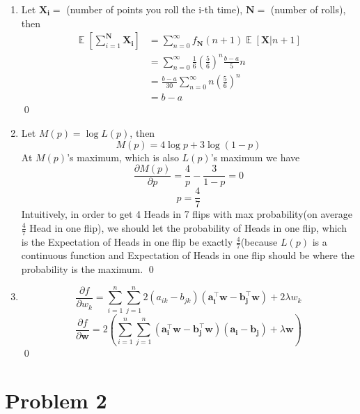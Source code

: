 \documentclass[12pt]{article}
\begin{document}
\begin{enumerate}[label=(\alph*)]
  \item
    Let $\mathbf{X_i} =$ (number of points you roll the i-th time), $\mathbf{N} =$ (number of rolls), then
    \begin{align*} \mathop{\mathbb{E}}[\sum_{i=1}^{\mathbf{N}}{\mathbf{X_i}}] &= \sum_{n=0}^{\infty}f_{\mathbf{N}}(n+1)\mathop{\mathbb{E}}[\mathbf{X}|n+1] \\
    &= \sum_{n=0}^{\infty}\frac{1}{6}(\frac{5}{6})^n\frac{b-a}{5}n \\
    &= \frac{b-a}{30}\sum_{n=0}^{\infty}n(\frac{5}{6})^n \\
    &= b-a\end{align*}  \qed

  \item
    Let $M(p) = \log{L(p)}$, then
    \begin{equation}M(p) = 4\log{p}+3\log{(1-p)}\end{equation}
    At $M(p)$'s maximum, which is also $L(p)$'s maximum we have
    \begin{equation}\frac{\partial{M(p)}}{\partial p}=\frac{4}{p}-\frac{3}{1-p}=0\end{equation}
    \begin{equation}p = \frac{4}{7}\end{equation}
    Intuitively, in order to get 4 Heads in 7 flips with max probability(on average $\frac{4}{7}$ Head in one flip), we should let the probability of Heads in one flip, which is the Expectation of Heads in one flip be exactly $\frac{4}{7}$(because $L(p)$ is a continuous function and Expectation of Heads in one flip should be where the probability is the maximum. \qed
    
  \item 
    \begin{equation}\frac{\partial f}{\partial w_k} = \sum_{i=1}^{n}\sum_{j=1}^{n}2(a_{ik}-b_{jk})(\mathbf{a_i^\top w-b_j^\top w})+2\lambda w_k\end{equation}
    \begin{equation}\frac{\partial f}{\partial \mathbf w} = 2(\sum_{i=1}^{n}\sum_{j=1}^{n}(\mathbf{a_i^\top w-b_j^\top w})(\mathbf{a_{i}-b_{j}})+\lambda\mathbf w)\end{equation} \qed
\end{enumerate}

\section*{Problem 2}
\end{document}
